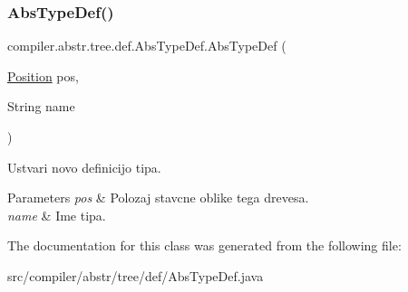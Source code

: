 \subsubsection{\texorpdfstring{Abs\+Type\+Def()}{AbsTypeDef()}}
{\footnotesize\ttfamily compiler.\+abstr.\+tree.\+def.\+Abs\+Type\+Def.\+Abs\+Type\+Def (\begin{DoxyParamCaption}\item[{\hyperlink{classcompiler_1_1_position}{Position}}]{pos,  }\item[{String}]{name }\end{DoxyParamCaption})}

Ustvari novo definicijo tipa.


\begin{DoxyParams}{Parameters}
{\em pos} & Polozaj stavcne oblike tega drevesa. \\
\hline
{\em name} & Ime tipa. \\
\hline
\end{DoxyParams}


The documentation for this class was generated from the following file\+:\begin{DoxyCompactItemize}
\item 
src/compiler/abstr/tree/def/Abs\+Type\+Def.\+java\end{DoxyCompactItemize}
